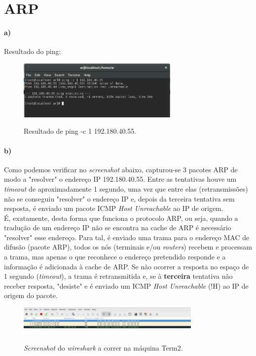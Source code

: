 \section{ARP}
\paragraph{a)}
Resultado do ping:
\begin{figure}[h]
\centering
\includegraphics[width=0.7\textwidth]{2_a_screenshot.png}
\label{fig:ping}
\caption{Resultado de \textsf{ping -c 1 192.180.40.55}.}
\end{figure}

\paragraph{b)}
Como podemos verificar no \emph{screenshot} abaixo, capturou-se 3 pacotes ARP de modo a "resolver" o endereço IP 192.180.40.55. Entre as tentativas houve um \emph{timeout} de aproximadamente 1 segundo, uma vez que entre elas (retransmissões) não se conseguiu "resolver" o endereço IP e, depois da terceira tentativa sem resposta, é enviado um pacote ICMP \emph{Host Unreachable} ao IP de origem.\\
É, exatamente, desta forma que funciona o protocolo ARP, ou seja, quando a tradução de um endereço IP não se encontra na cache de ARP é necessário "resolver" esse endereço. Para tal, é enviado uma trama para o endereço MAC de difusão (pacote ARP), todos os nós (terminais e/ou \emph{routers}) recebem e processam a trama, mas apenas o que reconhece o endereço pretendido responde e a informação é adicionada à cache de ARP. Se não ocorrer a resposta no espaço de 1 segundo (\emph{timeout}), a trama é retransmitida e, se à \textbf{terceira} tentativa não receber resposta, "desiste" e é enviado um ICMP \emph{Host Unreachable} (!H) ao IP de origem do pacote.

\begin{figure}[h]
\centering
\includegraphics[width=0.8\textwidth, height=0.13\textheight]{2_a__screenshot.png}
\label{fig:wireshark}
\caption{\emph{Screenshot} do \emph{wireshark} a correr na máquina \textsf{Term2}.}
\end{figure}